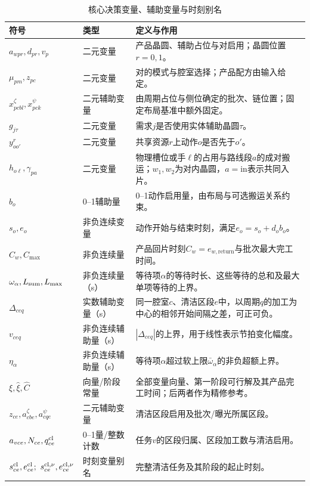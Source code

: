 \documentclass[final,5p,times,twocolumn]{elsarticle}
\begin{document}
\begin{table}[t]
\centering
\scriptsize
\setlength{\tabcolsep}{3pt}
\caption{核心决策变量、辅助变量与时刻别名}
\label{tab:symbol-cn-b}
\begin{tabular}{C{0.20\textwidth}C{0.16\textwidth}C{0.43\textwidth}}
\toprule
符号 & 类型 & 定义与作用 \\
\midrule
$a_{wpr},d_{pr},v_p$ & 二元变量 & 产品晶圆、辅助占位与对启用；晶圆位置$r=0,1$。\\
$\mu_{pm},z_{pc}$ & 二元变量 & 对的模式与腔室选择；产品配方由输入给定。\\
$x^{\zeta}_{pcbl},x^{\psi}_{pck}$ & 二元辅助变量 & 由周期占位与侧位确定的批次、链位置；固定布局基准中额外固定。\\
$g_{j\tau}$ & 二元变量 & 需求$j$是否使用实体辅助晶圆$\tau$。\\
$y^r_{oo'}$ & 二元变量 & 共享资源$r$上动作$o$是否先于$o'$。\\
$h_{o\ell},\gamma_{pa}$ & 二元变量 & 物理槽位或手$\ell$的占用与路线段$a$的成对搬运；$w_1,w_2$为对内晶圆，$a=\mathrm{in}$表示共同入片。\\
$b_o$ & 0--1辅助量 & 0--1动作启用量，由布局与可选搬运关系约束。\\
$s_o,e_o$ & 非负连续变量 & 动作开始与结束时刻，满足$e_o=s_o+d_ob_o$。\\
$C_w,C_{\max}$ & 非负连续量 & 产品回片时刻$C_w=e_{w,\mathrm{return}}$与批次最大完工时间。\\
$\omega_\alpha,L_{\rm sum},L_{\max}$ & 非负连续量（s） & 等待项$\alpha$的等待时长、这些等待的总和及最大单项等待的上界。\\
$\Delta_{ceq}$ & 实数辅助变量（s） & 同一腔室$c$、清洁区段$e$中，以周期$q$的加工为中心的相邻开始间隔之差，可正可负。\\
$v_{ceq}$ & 非负连续辅助量（s） & $|\Delta_{ceq}|$的上界，用于线性表示节拍变化幅度。\\
$\eta_\alpha$ & 非负连续辅助量（s） & 等待项$\alpha$超过软上限$\bar\omega_\alpha$的非负超额上界。\\
$\xi,\widehat\xi,\widehat C$ & 向量/阶段常量 & 全部变量向量、第一阶段可行解及其产品完工时间；后两者作为精修参考。\\
$z_{ce},a^{\zeta}_{cbe},a^{\psi}_{cqe}$ & 二元辅助变量 & 清洁区段启用及批次/曝光所属区段。\\
$a_{vce},N_{ce},q^{\rm cl}_{ce}$ & 0--1量/整数计数 & 任务$v$的区段归属、区段加工数与清洁启用。\\
$s^{\rm cl}_{ce},e^{\rm cl}_{ce};\ s^{\rm cl,\nu}_{ce},e^{\rm cl,\nu}_{ce}$ & 时刻变量别名 & 完整清洁任务及其阶段的起止时刻。\\

\end{tabular}
\end{table}
\end{document}
